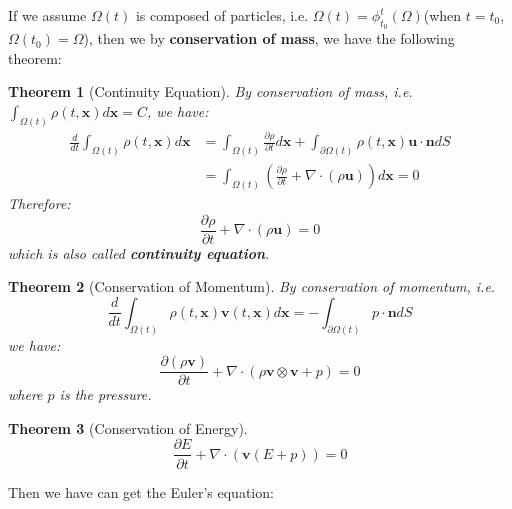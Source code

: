\documentclass{article}
\newtheorem{theorem}{Theorem}
\begin{document}
If we assume $\Omega(t)$ is composed of particles, i.e. $\Omega(t)=\phi_{t_0}^t(\Omega)$(when $t = t_0$, $\Omega(t_0)=\Omega$), 
then we by \textbf{conservation of mass}, we have the following theorem:
\begin{theorem}[Continuity Equation]
    By conservation of mass, i.e. $\int_{\Omega(t)} \rho(t, \mathbf{x}) d\mathbf{x} = C$, we have:
    \begin{equation}
        \begin{aligned}
            \frac{d}{dt}\int_{\Omega(t)} \rho(t, \mathbf{x}) d\mathbf{x} &= \int_{\Omega(t)} \frac{\partial \rho}{\partial t} d\mathbf{x} + \int_{\partial \Omega(t)} \rho(t, \mathbf{x}) \mathbf{u} \cdot \mathbf{n} d S\\ 
            &= \int_{\Omega(t)} \left(\frac{\partial \rho}{\partial t}  + \nabla\cdot \left(\rho\mathbf{u}\right)\right) d\mathbf{x}=0
        \end{aligned}
    \end{equation}
    Therefore:
    \begin{equation}
        \frac{\partial \rho}{\partial t}  + \nabla\cdot \left(\rho\mathbf{u}\right) = 0
    \end{equation}
    which is also called \textbf{continuity equation}.
\end{theorem}
\begin{theorem}[Conservation of Momentum]
    By conservation of momentum, i.e. 
    \begin{equation}
        \frac{d}{dt}\int_{\Omega(t)} \rho(t, \mathbf{x})\mathbf{v}(t, \mathbf{x}) d\mathbf{x} = -\int_{\partial \Omega(t)} p\cdot \mathbf{n} d S
    \end{equation}
    we have:
    \begin{equation}
        \frac{\partial (\rho \mathbf{v})}{\partial t} + \nabla\cdot \left(\rho \mathbf{v} \otimes \mathbf{v} + p\right) = 0
    \end{equation}
    where $p$ is the pressure.
\end{theorem}
\begin{theorem}[Conservation of Energy]
    \begin{equation}
        \frac{\partial E}{\partial t} + \nabla\cdot \left(\mathbf{v}(E + p)\right) = 0
    \end{equation}
\end{theorem}
Then we have can get the Euler's equation:
\end{document}
